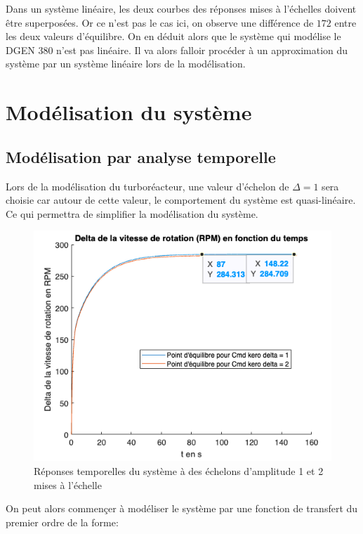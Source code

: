 \documentclass[12pt]{report}
\begin{document}
Dans un système linéaire, les deux courbes des réponses mises à l'échelles doivent 
être superposées. Or ce n'est pas le cas ici, on observe une différence de $172$ entre
les deux valeurs d'équilibre. On en déduit alors que le système qui modélise le DGEN 380
n'est pas linéaire. Il va alors falloir procéder à un approximation du système par un
système linéaire lors de la modélisation.


\newpage


\section{Modélisation du système}

\subsection{Modélisation par analyse temporelle}

Lors de la modélisation du turboréacteur, une valeur d'échelon de $\Delta = 1$ 
sera choisie car autour de cette valeur, le comportement du système est quasi-linéaire.
Ce qui permettra de simplifier la modélisation du système.

\begin{figure}[!h]
  \vspace{1cm}
  \centering
  \includegraphics[scale=0.7]{fig/step_response_delta1-2_scaled.png}
  \caption{Réponses temporelles du système à des échelons d'amplitude 1 et 2 mises à l'échelle}
\end{figure}

On peut alors commençer à modéliser le système par une fonction de transfert 
du premier ordre de la forme:
\end{document}
